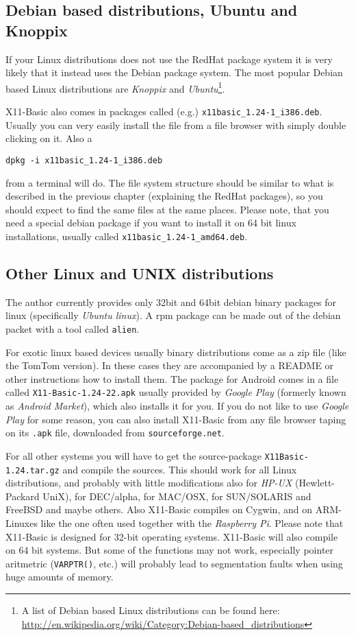 \subsection*{Debian based distributions, Ubuntu and Knoppix} 

If your Linux distributions does not use the RedHat package system it is very
likely that it instead uses the Debian package system. The most popular Debian
based Linux distributions are {\it Knoppix} and {\it Ubuntu}\footnote{A list of
Debian based Linux distributions can be found here:
\url{http://en.wikipedia.org/wiki/Category:Debian-based_distributions}}. 

X11-Basic also comes in packages called (e.g.)
\verb|x11basic_1.24-1_i386.deb|. Usually you can very easily install the file
from a file browser with simply double clicking on it. Also a 
\begin{verbatim}
dpkg -i x11basic_1.24-1_i386.deb
\end{verbatim} 
from a terminal will do. The file system structure should be similar
to what is described in the previous chapter (explaining the RedHat packages),
so you should expect to find the same files at the same places. Please note, 
that you need a special debian package if you want to install it on 64 bit linux
installations, usually called \verb|x11basic_1.24-1_amd64.deb|. 

\subsection*{Other Linux and UNIX distributions}

The author currently provides only 32bit and 64bit debian binary packages for 
linux (specifically {\it Ubuntu linux}). A
rpm package can be made out of the debian packet with a tool called
\verb|alien|. 

For exotic linux based devices usually binary distributions come as a zip file
(like the TomTom version). In these cases they are accompanied by a README or
other instructions how to install them. The  package for Android comes in a file
called \verb|X11-Basic-1.24-22.apk| usually  provided by {\it Google Play}
(formerly known as {\it Android Market}), which also installs it for you. If you
do not like to use {\it Google Play} for some reason, you can also install
X11-Basic from any file browser taping on its \verb|.apk| file, downloaded from
\verb|sourceforge.net|. 

For all other systems you will have to get the source-package 
\verb|X11Basic-1.24.tar.gz| and compile the sources. This should work for  all
Linux distributions, and probably with little modifications also for {\it
HP-UX} (Hewlett-Packard UniX), for DEC/alpha, for MAC/OSX, for SUN/SOLARIS and
FreeBSD and maybe others.  Also X11-Basic compiles on Cygwin, and on
ARM-Linuxes like the one often used together with the {\it Raspberry Pi}. 
Please note that X11-Basic is designed for 32-bit operating systems. 
X11-Basic will also compile on 64 bit systems. But some of the
functions may not work, especially pointer aritmetric (\verb|VARPTR()|, etc.)
will probably lead to segmentation faults when using huge amounts of memory. 

